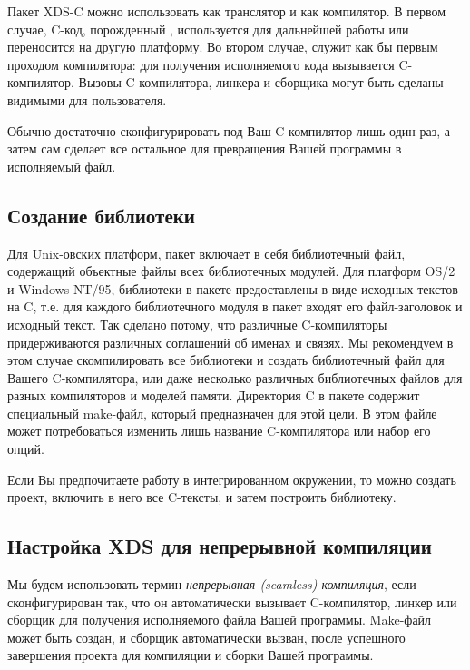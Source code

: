 \ifgenc %

Пакет XDS-C можно использовать как транслятор и как компилятор.
В первом случае, C-код, порожденный \XDS{}, используется для
дальнейшей работы или переносится на другую платформу. Во втором случае,
\XDS{} служит как бы первым проходом компилятора: для получения 
исполняемого кода вызывается C-компилятор. Вызовы C-компилятора,
линкера и сборщика могут быть сделаны видимыми для пользователя. %

Обычно достаточно сконфигурировать \XDS{} под Ваш C-компилятор
лишь один раз, а затем \XDS{} сам сделает все остальное для превращения
Вашей программы в исполняемый файл.

\subsection{Создание библиотеки}

Для Unix-овских платформ, пакет \XDS{} включает в себя библиотечный файл,
содержащий объектные файлы всех библиотечных модулей.
Для платформ OS/2 и Windows NT/95, библиотеки в пакете \XDS{}
предоставлены в виде исходных текстов на C, т.е. для каждого библиотечного
модуля в пакет входят его файл-заголовок и исходный текст.
Так сделано потому, что различные C-компиляторы придерживаются
различных соглашений об именах и связях. Мы рекомендуем в этом случае
скомпилировать все библиотеки и создать библиотечный файл для 
Вашего C-компилятора, или даже несколько различных библиотечных файлов
для разных компиляторов и моделей памяти.
Директория C в пакете \XDS{} содержит специальный 
make-файл, который предназначен для этой цели. В этом файле может 
потребоваться изменить лишь название C-компилятора или набор его
опций.

Если Вы предпочитаете работу в интегрированном окружении, то можно
создать проект, включить в него все C-тексты, и затем построить 
библиотеку.

\subsection{Настройка XDS для непрерывной компиляции}\label{config:seamless}

Мы будем использовать термин {\em непрерывная (seamless) компиляция},
если \xds{} сконфигурирован так, что он автоматически вызывает
C-компилятор, линкер или сборщик для получения исполняемого 
файла Вашей программы. Make-файл может быть создан, и сборщик 
автоматически вызван, после успешного завершения проекта для компиляции
и сборки Вашей программы.


